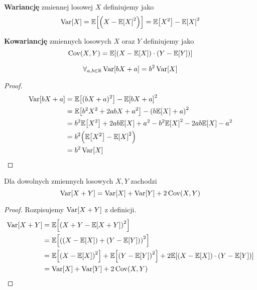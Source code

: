 \begin{definition}
	\textbf{Wariancję} zmiennej losowej \( X \) definiujemy jako
	\[
		\variance{X} = \expected{\pars{X - \expected{X}^2}} = \expected{X^2} - \expected{X}^2
	\]
\end{definition}
\begin{definition}
	\textbf{Kowariancję} zmiennych losowych \( X \) oraz \( Y \) definiujemy jako
	\[
		\covariance{X}{Y} = \expected{\pars{X - \expected{X}} \cdot \pars{Y - \expected{Y}}}
	\]
\end{definition}

\begin{theorem}
	\[
		\forall_{a, b \in \real} \variance{bX + a} = b^2\variance{X}
	\]
\end{theorem}
\begin{proof}
	\begin{align*}
		\variance{bX + a}
		 & = \expected{(bX + a)^2} - \expected{bX + a}^2                                           \\
		 & = \expected{b^2X^2 + 2abX + a^2} - \pars{b\expected{X} + a}^2                           \\
		 & = b^2\expected{X^2} + 2ab\expected{X} + a^2 - b^2\expected{X}^2 - 2ab\expected{X} - a^2 \\
		 & = b^2\pars{\expected{X^2} - \expected{X}^2}                                             \\
		 & = b^2\variance{X}
	\end{align*}
\end{proof}

\begin{theorem}
	Dla dowolnych zmiennych losowych \( X, Y \) zachodzi
	\[
		\variance{X + Y} = \variance{X} + \variance{Y} + 2\covariance{X}{Y}
	\]
\end{theorem}
\begin{proof}
	Rozpisujemy \( \variance{X + Y} \) z definicji.
	\begin{align*}
		\variance{X + Y}
		 & = \expected{\pars{X + Y - \expected{X + Y}}^2}                                \\
		 & = \expected{\pars{\pars{X - \expected{X}} + \pars{Y - \expected{Y}}}^2}       \\
		 & = \expected{\pars{X - \expected{X}}^2} + \expected{\pars{Y - \expected{Y}}^2}
		+ 2\expected{\pars{X - \expected{X}}\cdot\pars{Y - \expected{Y}}}                \\
		 & = \variance{X} + \variance{Y} + 2\covariance{X}{Y}
	\end{align*}
\end{proof}

